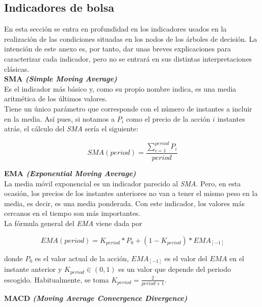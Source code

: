 \begin{appendices}
\chapter{Indicadores de bolsa}
En esta secci\'on se entra en profundidad en los indicadores usados en la realizaci\'on de las condiciones situadas en los nodos de los \'arboles de decisi\'on. La intenci\'on de este anexo es, por tanto, dar unas breves explicaciones para caracterizar cada indicador, pero no se entrar\'a en sus distintas interpretaciones cl\'asicas.\\


\noindent\textbf{SMA \textit{(Simple Moving Average)}}\\

Es el indicador m\'as b\'asico y, como su propio nombre indica, es una media aritm\'etica de los \'ultimos valores.\\

Tiene un \'unico par\'ametro que corresponde con el n\'umero de instantes a incluir en la media. As\'i pues, si notamos a $P_i$ como el precio de la acci\'on $i$ instantes atr\'as, el c\'alculo del \textit{SMA} ser\'ia el siguiente:

\[SMA(period) = \frac{\sum\limits_{i=1}^{period}P_i}{period}\]

\vspace{0.5cm}
\noindent\textbf{EMA \textit{(Exponential Moving Average)}}\\

La media m\'ovil exponencial es un indicador parecido al \textit{SMA}. Pero, en esta ocasi\'on, los precios de los instantes anteriores no van a tener el mismo peso en la media, es decir, es una media ponderada. Con este indicador, los valores m\'as cercanos en el tiempo son m\'as importantes.\\

La f\'ormula general del \textit{EMA} viene dada por

\[EMA(period) = K_{period} * P_0 + (1 - K_{period}) * EMA_{[-1]}\]

donde $P_0$ es el valor actual de la acci\'on, $EMA_{[-1]}$ es el valor del $EMA$ en el instante anterior y $K_{period} \in (0,1)$ es un valor que depende del periodo escogido. Habitualmente, se toma $K_{period} = \frac{2}{period + 1}$. 

\vspace{0.5cm}
\noindent\textbf{MACD \textit{(Moving Average Convergence Divergence)}}\\


\end{appendices}
